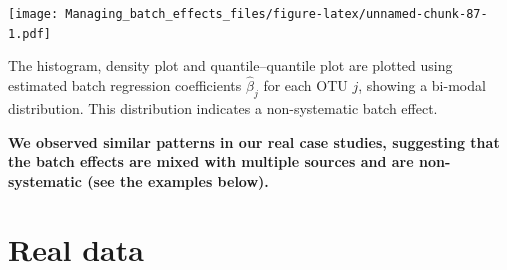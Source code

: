 \documentclass[]{book}
\newenvironment{Shaded}{\begin{snugshade}}{\end{snugshade}}
\newcommand{\KeywordTok}[1]{\textcolor[rgb]{0.13,0.29,0.53}{\textbf{#1}}}
\newcommand{\DataTypeTok}[1]{\textcolor[rgb]{0.13,0.29,0.53}{#1}}
\newcommand{\DecValTok}[1]{\textcolor[rgb]{0.00,0.00,0.81}{#1}}
\newcommand{\StringTok}[1]{\textcolor[rgb]{0.31,0.60,0.02}{#1}}
\newcommand{\ControlFlowTok}[1]{\textcolor[rgb]{0.13,0.29,0.53}{\textbf{#1}}}
\newcommand{\OperatorTok}[1]{\textcolor[rgb]{0.81,0.36,0.00}{\textbf{#1}}}
\newcommand{\NormalTok}[1]{#1}
\begin{document}
\begin{Shaded}
\end{Shaded}

\texttt{[image: Managing\_batch\_effects\_files/figure-latex/unnamed-chunk-87-1.pdf]}

The histogram, density plot and quantile--quantile plot are plotted
using estimated batch regression coefficients \(\hat{\beta}_{j}\) for
each OTU \(j\), showing a bi-modal distribution. This distribution
indicates a non-systematic batch effect.

\textbf{We observed similar patterns in our real case studies,
suggesting that the batch effects are mixed with multiple sources and
are non-systematic (see the examples below).}

\section{Real data}\label{real-data}
\end{document}
